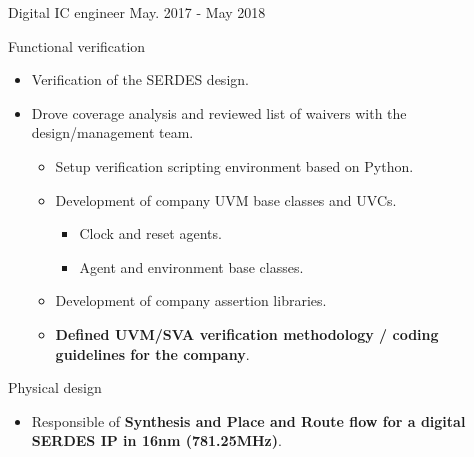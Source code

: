 \begin{cventries}
  \cventry
    {Digital IC engineer} %
    {} %
    {} %
    {May. 2017 - May 2018} %
    {
      \begin{cvitems} %
        \item {Functional verification}
        \begin{itemize}
          \item {Verification of the SERDES design.}
          \item {Drove coverage analysis and reviewed list of waivers with the design/management team.}
          \begin{itemize}
            \item {Setup verification scripting environment based on Python.}
            \item {Development of company UVM base classes and UVCs.}
              \begin{itemize}
                \item {Clock and reset agents.}
                \item {Agent and environment base classes.}
              \end{itemize}
            \item {Development of company assertion libraries.}
            \item {\textbf{Defined UVM/SVA verification methodology / coding guidelines for the company}.}
          \end{itemize}
        \end{itemize}
        \item {Physical design}
        \begin{itemize}
          \item {Responsible of \textbf{Synthesis and Place and Route flow for a digital SERDES IP in 16nm (781.25MHz)}.}

\end{itemize}
\end{cvitems}}
\end{cventries}
